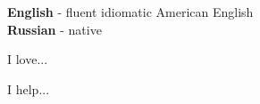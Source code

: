 \documentclass[9pt]{developercv} %
\begin{document}

\begin{minipage}[t]{0.3\textwidth}
	\vspace{-\baselineskip} %

	
	\textbf{English} - fluent idiomatic American English\\
	\textbf{Russian} - native\\
\end{minipage}
\hfill
\begin{minipage}[t]{0.3\textwidth}
	\vspace{-\baselineskip} %
	
	
	I love... \lorem
\end{minipage}
\hfill
\begin{minipage}[t]{0.3\textwidth}
	\vspace{-\baselineskip} %
	
	
	I help... \lorem
\end{minipage}

\end{document}
